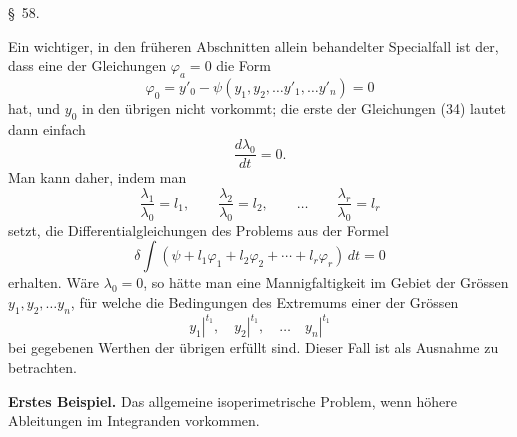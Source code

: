 \documentclass[11pt,a4paper,leqno]{article}
\begin{document}

\begin{center}
{\large \S~58.}
\end{center}

Ein wichtiger, in den früheren Abschnitten allein behandelter Specialfall ist der, dass eine der Gleichungen $\varphi_a=0$ die Form
\[
\varphi_0=y'_0-\psi(y_1,y_2,\ldots y'_1,\ldots y'_n)=0
\]
hat, und $y_0$ in den übrigen nicht vorkommt; die erste der Gleichungen (34) lautet dann einfach
\[
\frac{d\lambda_0}{dt}=0.
\]
Man kann daher, indem man
\[
\frac{\lambda_1}{\lambda_0}=l_1,\qquad
\frac{\lambda_2}{\lambda_0}=l_2,\qquad\ldots\qquad
\frac{\lambda_r}{\lambda_0}=l_r
\]
setzt, die Differentialgleichungen des Problems aus der Formel
\[
\delta\int(\psi+l_1\varphi_1+l_2\varphi_2+\cdots+l_r\varphi_r)\,dt=0
\]
erhalten. Wäre $\lambda_0=0$, so hätte man eine Mannigfaltigkeit im Gebiet der Grössen $y_1,y_2,\ldots y_n$, für welche die Bedingungen des Extremums einer der Grössen
\[
\left.y_1\right|^{t_1},\quad
\left.y_2\right|^{t_1},\quad\ldots\quad
\left.y_n\right|^{t_1}
\]
bei gegebenen Werthen der übrigen erfüllt sind. Dieser Fall ist als Ausnahme zu betrachten.

\noindent\textbf{Erstes Beispiel.} Das allgemeine isoperimetrische Problem, wenn höhere Ableitungen im Integranden vorkommen.
\end{document}
